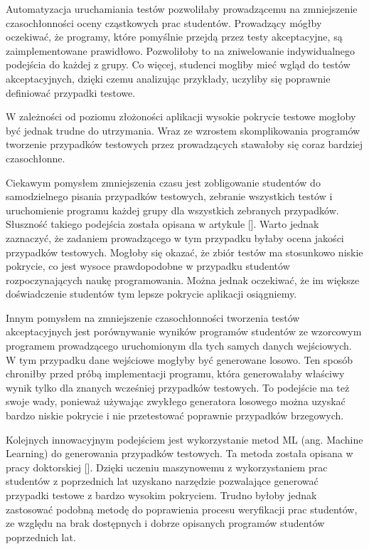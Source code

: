 Automatyzacja uruchamiania testów pozwoliłaby prowadzącemu na zmniejszenie czasochłonności oceny cząstkowych prac studentów.
Prowadzący mógłby oczekiwać, że programy, które pomyślnie przejdą przez testy akceptacyjne, są zaimplementowane prawidłowo.
Pozwoliłoby to na zniwelowanie indywidualnego podejścia do każdej z grupy.
Co więcej, studenci mogliby mieć wgląd do testów akceptacyjnych, dzięki czemu analizując przykłady, uczyliby się poprawnie definiować przypadki testowe.

W zależności od poziomu złożoności aplikacji wysokie pokrycie testowe mogłoby być jednak trudne do utrzymania.
Wraz ze wzrostem skomplikowania programów tworzenie przypadków testowych przez prowadzących stawałoby się coraz bardziej czasochłonne.

Ciekawym pomysłem zmniejszenia czasu jest zobligowanie studentów do samodzielnego pisania przypadków testowych, zebranie wszystkich testów i uruchomienie programu każdej grupy dla wszystkich zebranych przypadków. 
Słuszność takiego podejścia została opisana w artykule [].
Warto jednak zaznaczyć, że zadaniem prowadzącego w tym przypadku byłaby ocena jakości przypadków testowych.
Mogłoby się okazać, że zbiór testów ma stosunkowo niskie pokrycie, co jest wysoce prawdopodobne w przypadku studentów rozpoczynających naukę programowania.
Można jednak oczekiwać, że im większe doświadczenie studentów tym lepsze pokrycie aplikacji osiągniemy.

Innym pomysłem na zmniejszenie czasochłonności tworzenia testów akceptacyjnych jest porównywanie wyników programów studentów ze wzorcowym programem prowadzącego uruchomionym dla tych samych danych wejściowych.
W tym przypadku dane wejściowe mogłyby być generowane losowo.
Ten sposób chroniłby przed próbą implementacji programu, która generowałaby właściwy wynik tylko dla znanych wcześniej przypadków testowych.
To podejście ma też swoje wady, ponieważ używając zwykłego generatora losowego można uzyskać bardzo niskie pokrycie i nie przetestować poprawnie przypadków brzegowych.

Kolejnych innowacyjnym podejściem jest wykorzystanie metod ML (ang. Machine Learning) do generowania przypadków testowych. 
Ta metoda została opisana w pracy doktorskiej []. 
Dzięki uczeniu maszynowemu z wykorzystaniem prac studentów z poprzednich lat uzyskano narzędzie pozwalające generować przypadki testowe z bardzo wysokim pokryciem.
Trudno byłoby jednak zastosować podobną metodę do poprawienia procesu weryfikacji prac studentów, ze względu na brak dostępnych i dobrze opisanych programów studentów poprzednich lat.




